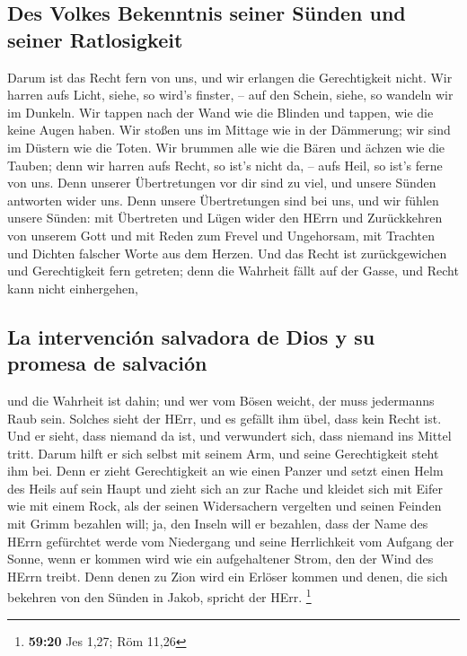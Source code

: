 \hypertarget{des-volkes-bekenntnis-seiner-suxfcnden-und-seiner-ratlosigkeit}{%
\subsection{Des Volkes Bekenntnis seiner Sünden und seiner
Ratlosigkeit}\label{des-volkes-bekenntnis-seiner-suxfcnden-und-seiner-ratlosigkeit}}

 Darum ist das Recht fern von uns, und wir erlangen die
Gerechtigkeit nicht. Wir harren aufs Licht, siehe, so wird's finster, --
auf den Schein, siehe, so wandeln wir im Dunkeln.  Wir
tappen nach der Wand wie die Blinden und tappen, wie die keine Augen
haben. Wir stoßen uns im Mittage wie in der Dämmerung; wir sind im
Düstern wie die Toten.  Wir brummen alle wie die Bären
und ächzen wie die Tauben; denn wir harren aufs Recht, so ist's nicht
da, -- aufs Heil, so ist's ferne von uns.  Denn unserer
Übertretungen vor dir sind zu viel, und unsere Sünden antworten wider
uns. Denn unsere Übertretungen sind bei uns, und wir fühlen unsere
Sünden:  mit Übertreten und Lügen wider den HErrn und
Zurückkehren von unserem Gott und mit Reden zum Frevel und Ungehorsam,
mit Trachten und Dichten falscher Worte aus dem Herzen. 
Und das Recht ist zurückgewichen und Gerechtigkeit fern getreten; denn
die Wahrheit fällt auf der Gasse, und Recht kann nicht einhergehen,

\hypertarget{la-intervenciuxf3n-salvadora-de-dios-y-su-promesa-de-salvaciuxf3n}{%
\subsection{La intervención salvadora de Dios y su promesa de
salvación}\label{la-intervenciuxf3n-salvadora-de-dios-y-su-promesa-de-salvaciuxf3n}}

 und die Wahrheit ist dahin; und wer vom Bösen weicht,
der muss jedermanns Raub sein. Solches sieht der HErr, und es gefällt
ihm übel, dass kein Recht ist.  Und er sieht, dass
niemand da ist, und verwundert sich, dass niemand ins Mittel tritt.
Darum hilft er sich selbst mit seinem Arm, und seine Gerechtigkeit steht
ihm bei.  Denn er zieht Gerechtigkeit an wie einen Panzer
und setzt einen Helm des Heils auf sein Haupt und zieht sich an zur
Rache und kleidet sich mit Eifer wie mit einem Rock,  als
der seinen Widersachern vergelten und seinen Feinden mit Grimm bezahlen
will; ja, den Inseln will er bezahlen,  dass der Name des
HErrn gefürchtet werde vom Niedergang und seine Herrlichkeit vom Aufgang
der Sonne, wenn er kommen wird wie ein aufgehaltener Strom, den der Wind
des HErrn treibt.  Denn denen zu Zion wird ein Erlöser
kommen und denen, die sich bekehren von den Sünden in Jakob, spricht der
HErr. \footnote{\textbf{59:20} Jes 1,27; Röm 11,26}

